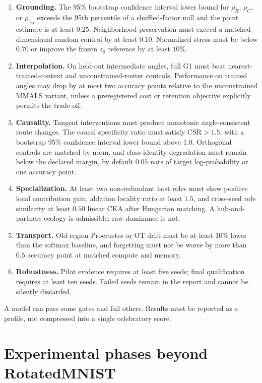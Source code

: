 \documentclass[11pt,a4paper]{article}
\begin{document}
\begin{enumerate}[label=\textbf{Gate \arabic*:}]
\item \textbf{Grounding.} The 95\% bootstrap confidence interval lower bound for \(\rho_R\), \(\rho_C\), or \(\rho_{z_M}\) exceeds the 95th percentile of a shuffled-factor null and the point estimate is at least \(0.25\). Neighborhood preservation must exceed a matched-dimensional random control by at least \(0.10\). Normalized stress must be below \(0.70\) or improve the frozen \(z_0\) reference by at least \(10\%\).
\item \textbf{Interpolation.} On held-out intermediate angles, full G1 must beat nearest-trained-context and unconstrained-router controls. Performance on trained angles may drop by at most two accuracy points relative to the unconstrained MMALS variant, unless a preregistered cost or retention objective explicitly permits the trade-off.
\item \textbf{Causality.} Tangent interventions must produce monotonic angle-consistent route changes. The causal specificity ratio must satisfy \(\mathrm{CSR}>1.5\), with a bootstrap 95\% confidence interval lower bound above \(1.0\). Orthogonal controls are matched by norm, and class-identity degradation must remain below the declared margin, by default \(0.05\) nats of target log-probability or one accuracy point.
\item \textbf{Specialization.} At least two non-redundant host roles must show positive local contribution gain, ablation locality ratio at least \(1.5\), and cross-seed role similarity at least \(0.50\) linear CKA after Hungarian matching. A hub-and-partners ecology is admissible; raw dominance is not.
\item \textbf{Transport.} Old-region Procrustes or OT drift must be at least \(10\%\) lower than the softmax baseline, and forgetting must not be worse by more than \(0.5\) accuracy point at matched compute and memory.
\item \textbf{Robustness.} Pilot evidence requires at least five seeds; final qualification requires at least ten seeds. Failed seeds remain in the report and cannot be silently discarded.
\end{enumerate}

A model can pass some gates and fail others. Results must be reported as a profile, not compressed into a single celebratory score.

\section{Experimental phases beyond RotatedMNIST}
\end{document}

